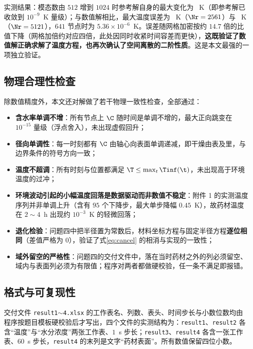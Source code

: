 实测结果：模态数由 $512$ 增到 $1024$ 时参考解自身的最大变化为 \QOneBesselModes~K（即参考解已收敛到 $10^{-9}$~K 量级）；与数值解相比，最大温度误差为 \QOneBesselNTwoFiveSixOne~K（$\Nr=2561$）与 \QOneBesselNFiveOneTwoOne~K（$\Nr=5121$），$641$ 节点时为 $5.36\times10^{-6}$~K。误差随网格加密按约 $14.7$ 倍的比值下降（网格加倍约对应四倍，此处因同时收紧时间容差而更快），\textbf{这既验证了数值解正确求解了温度方程，也再次确认了空间离散的二阶性质}。这是本文最强的一项独立验证。

\subsection{物理合理性检查}

除数值精度外，本文还对解做了若干物理一致性检查，全部通过：

\begin{itemize}
  \item \textbf{含水率单调不增}：所有节点上 $\C$ 随时间是单调不增的，最大正向跳变在 $10^{-15}$ 量级（浮点舍入），未出现虚假回升；
  \item \textbf{径向单调性}：每一时刻都有 $\C$ 由轴心向表面单调递减，即干燥由表及里，与边界条件的符号方向一致；
  \item \textbf{温度不超调}：所有时刻与位置都满足 $\T\le\max_t\Tinf(\t)$，未出现高于环境温度的过冲；
  \item \textbf{环境波动引起的小幅温度回落是数据驱动而非数值不稳定}：附件 1 的实测温度序列并非单调上升（含有 $95$ 个下降步，最大单步降幅 $0.45$~K），故药材温度在 $2\sim4$~h 出现约 $10^{-3}$~K 的轻微回落；
  \item \textbf{退化检验}：问题四中把半径置为常数后，材料坐标方程与固定半径方程\textbf{逐位相同}（差值严格为 $0$），验证了式\eqref{eq:cancel} 的相消与实现的一致性；
  \item \textbf{域外留空的严格性}：问题四的交付文件中，落在当时药材之外的列必须留空、域内与表面列必须为有限值；程序对两者都做硬校验，任一条不满足即报错。
\end{itemize}

\subsection{格式与可复现性}

交付文件 \texttt{result1$\sim$4.xlsx} 的工作表名、列数、表头、时间步长与小数位数均由程序按题目模板硬校验后才写出，四个文件的实测结构为：\texttt{result1}、\texttt{result2} 各含``温度''与``水分浓度''两张工作表、$1$~s 步长；\texttt{result3}、\texttt{result4} 各含一张工作表、$60$~s 步长，\texttt{result4} 的末列是文字``药材表面''。所有数值保留四位小数。

